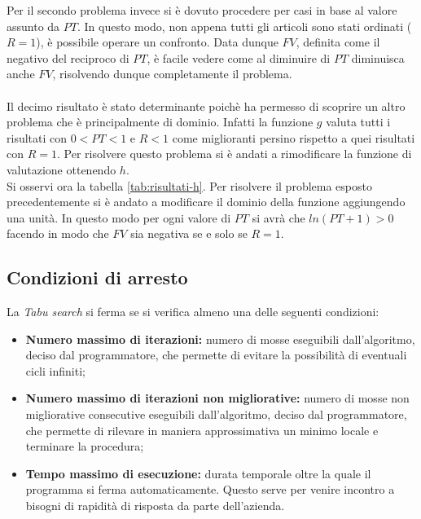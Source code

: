 \noindent Per il secondo problema invece si è dovuto procedere per casi in
base al valore assunto da $PT$. In questo modo, non appena
tutti gli articoli sono stati ordinati ($R=1$), è possibile operare
un confronto.
Data dunque $FV$, definita come il negativo del reciproco di $PT$,
è facile vedere come al diminuire di $PT$ diminuisca anche $FV$,
risolvendo dunque completamente il problema.\\\\

\noindent Il decimo risultato è stato determinante poichè ha permesso di
scoprire un altro problema che è principalmente di dominio.
Infatti la funzione $g$ valuta tutti i risultati con $0 < PT < 1$
e $R<1$ come miglioranti persino rispetto a quei
risultati con $R=1$. Per risolvere questo problema si è andati
a rimodificare la funzione di valutazione ottenendo $h$.\\

\noindent Si osservi ora la tabella \ref{tab:risultati-h}.
Per risolvere il problema esposto precedentemente si è andato
a modificare il dominio della funzione aggiungendo una unità.
In questo modo per ogni valore di $PT$ si avrà che
$ln(PT+1)>0$ facendo in modo che $FV$ sia negativa se e solo se
$R=1$.

\subsection{Condizioni di arresto}
\label{sec:condizioni-arresto}
\noindent La \textit{Tabu search} si ferma se si verifica almeno una delle seguenti condizioni:
\begin{itemize}
    \item \textbf{Numero massimo di iterazioni:} numero di mosse eseguibili dall'algoritmo, deciso
    dal programmatore, che permette di evitare la possibilità di eventuali cicli infiniti;
    \item \textbf{Numero massimo di iterazioni non migliorative:} numero di mosse non migliorative
    consecutive eseguibili dall'algoritmo, deciso dal programmatore, che permette
    di rilevare in maniera approssimativa un minimo
    locale e terminare la procedura;
    \item \textbf{Tempo massimo di esecuzione:}  durata temporale oltre
    la quale il programma si ferma automaticamente. Questo serve per venire incontro a
    bisogni di rapidità di risposta da parte dell’azienda.
    
\end{itemize}
